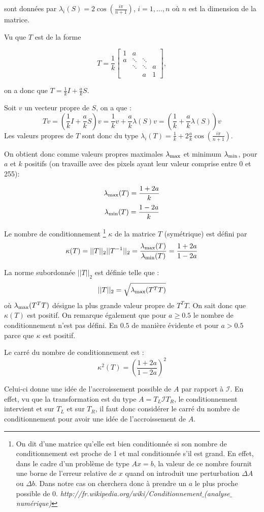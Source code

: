 sont données par $\lambda_i(S) = 2 \cos(\frac{i\pi}{n+1})$, $i= 1, \ldots , n$ où $n$ est la dimension de la matrice.

Vu que $T$ est de la forme

$$
 T = \frac{1}{k}
 \begin{bmatrix}
    1 & a 		& 			& \\
    a & \ddots 	& \ddots 	& \\
      & \ddots 	& \ddots 	& a \\
      & 		& a			& 1
  \end{bmatrix},
$$

on a donc que $T = \frac{1}{k} I + \frac{a}{k} S$.

Soit $v$ un vecteur propre de $S$, on a que :
\begin{equation}
T v = ( \frac{1}{k} I + \frac{a}{k} S ) v = \frac{1}{k} v + \frac{a}{k} \lambda(S) v = (\frac{1}{k} + \frac{a}{k} \lambda(S)) v
\end{equation}
Les valeurs propres de $T$ sont donc du type $\lambda_i(T) = \frac{1}{k} + 2 \frac{a}{k} \cos(\frac{i\pi}{n+1})$.

On obtient donc comme valeurs propres maximales $\lambda_\mathrm{max}$ et minimum $\lambda_\mathrm{min}$,
pour $a$ et $k$ positifs (on travaille avec des pixels ayant leur valeur comprise entre 0 et 255):

	$$\lambda_\mathrm{max} (T) =  \frac{1+2a}{k} $$
	$$\lambda_\mathrm{min} (T) =  \frac{1-2a}{k} $$

Le nombre de conditionnement
\footnote{On dit d'une matrice qu'elle est bien conditionnée si son nombre de conditionnement
  est proche de 1 et mal conditionnée s'il est grand.
En effet, dans le cadre d'un problème de type $Ax = b$,
la valeur de ce nombre fournit une borne de l'erreur relative de $x$ quand on introduit une perturbation $\Delta A $ ou $\Delta b$.
Dans notre cas on cherchera donc à prendre un $a$ le plus proche possible de 0.
\textit{http://fr.wikipedia.org/wiki/Conditionnement$\_$(analyse$\_$numérique)}}
 $\kappa$ de la matrice $T$ (symétrique) est défini par
\begin{equation}
	\kappa (T) = ||T||_2||T^{-1}||_2 = \frac{\lambda_\mathrm{max} (T)}{\lambda_\mathrm{min} (T)} = \frac{1+2a}{1-2a}
\end{equation}

La norme subordonnée $||T||_2$ est définie telle que :
$$||T||_2 = \sqrt{\lambda_\mathrm{max}(T^TT)}$$
où $\lambda_\mathrm{max}(T^TT)$ désigne la plus grande valeur propre de $T^TT$.
On sait donc que $\kappa(T) $ est positif.
On remarque également que pour $a \geq 0.5$ le nombre de conditionnement n'est pas défini.
En $0.5$ de manière évidente et pour $a > 0.5$ parce que $\kappa$ est positif.

Le carré du nombre de conditionnement est :
\begin{equation}
	\kappa^2 (T) = (\frac{1+2a}{1-2a})^2
\end{equation}

Celui-ci donne une idée de l'accroissement possible de $A$ par rapport à $\mathcal{I}$.
En effet, vu que la transformation est du type $A = T_L \mathcal{I} T_R$,
le conditionnement intervient et sur $T_L$ et sur $T_R$,
il faut donc considérer le carré du nombre de conditionnement pour avoir une idée de l'accroissement de $A$.
